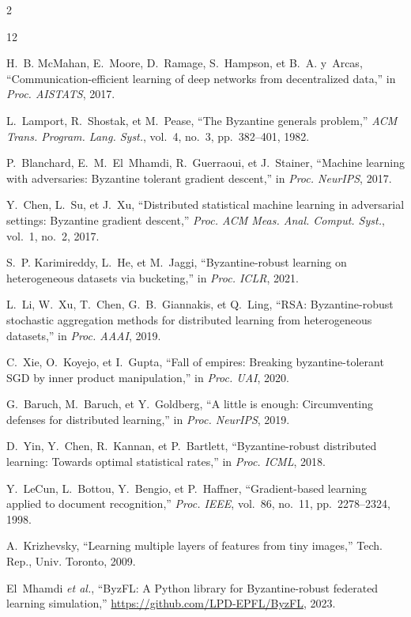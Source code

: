 \documentclass{article}
\begin{document}
\begin{multicols}{2}
\small
\begin{thebibliography}{12}
\setlength{\itemsep}{3pt}

   H.~B. McMahan, E.~Moore, D.~Ramage, S.~Hampson,
        et B.~A. y~Arcas, ``Communication-efficient learning of deep networks
        from decentralized data,'' in \textit{Proc. AISTATS}, 2017.

   L.~Lamport, R.~Shostak, et M.~Pease, ``The Byzantine
        generals problem,'' \textit{ACM Trans. Program. Lang. Syst.}, vol.~4,
        no.~3, pp.~382--401, 1982.

   P.~Blanchard, E.~M.~El~Mhamdi, R.~Guerraoui,
        et J.~Stainer, ``Machine learning with adversaries: Byzantine tolerant
        gradient descent,'' in \textit{Proc. NeurIPS}, 2017.

   Y.~Chen, L.~Su, et J.~Xu, ``Distributed statistical
        machine learning in adversarial settings: Byzantine gradient descent,''
        \textit{Proc. ACM Meas. Anal. Comput. Syst.}, vol.~1, no.~2, 2017.

   S.~P. Karimireddy, L.~He, et M.~Jaggi,
        ``Byzantine-robust learning on heterogeneous datasets via bucketing,''
        in \textit{Proc. ICLR}, 2021.

   L.~Li, W.~Xu, T.~Chen, G.~B.~Giannakis, et Q.~Ling,
        ``RSA: Byzantine-robust stochastic aggregation methods for distributed
        learning from heterogeneous datasets,'' in \textit{Proc. AAAI}, 2019.

   C.~Xie, O.~Koyejo, et I.~Gupta, ``Fall of empires:
        Breaking byzantine-tolerant SGD by inner product manipulation,''
        in \textit{Proc. UAI}, 2020.

   G.~Baruch, M.~Baruch, et Y.~Goldberg,
        ``A little is enough: Circumventing defenses for distributed learning,''
        in \textit{Proc. NeurIPS}, 2019.

   D.~Yin, Y.~Chen, R.~Kannan, et P.~Bartlett,
        ``Byzantine-robust distributed learning: Towards optimal statistical
        rates,'' in \textit{Proc. ICML}, 2018.

   Y.~LeCun, L.~Bottou, Y.~Bengio, et P.~Haffner,
        ``Gradient-based learning applied to document recognition,''
        \textit{Proc. IEEE}, vol.~86, no.~11, pp.~2278--2324, 1998.

   A.~Krizhevsky, ``Learning multiple layers of
        features from tiny images,'' Tech. Rep., Univ. Toronto, 2009.

   El~Mhamdi \textit{et al.}, ``ByzFL: A Python library
        for Byzantine-robust federated learning simulation,''
        \url{https://github.com/LPD-EPFL/ByzFL}, 2023.

\end{thebibliography}
\end{multicols}
\end{document}
